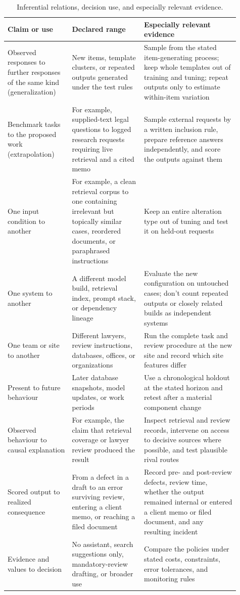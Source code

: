 \documentclass[12pt]{article}
\begin{document}
\begin{table}[tbp]
\centering\scriptsize
\renewcommand{\arraystretch}{0.92}
\caption{Inferential relations, decision use, and especially relevant evidence.}\label{tab:projection_relations}
\begin{tabular}{@{}>{\raggedright\arraybackslash}p{0.25\linewidth}
                    >{\raggedright\arraybackslash}p{0.29\linewidth}
                    >{\raggedright\arraybackslash}p{0.37\linewidth}@{}}
\toprule
Claim or use & Declared range & Especially relevant evidence \\
\midrule
Observed responses to further responses of the same kind (generalization) & New items, template clusters, or repeated outputs generated under the test rules & Sample from the stated item-generating process; keep whole templates out of training and tuning; repeat outputs only to estimate within-item variation \\
Benchmark tasks to the proposed work (extrapolation) & For example, supplied-text legal questions to logged research requests requiring live retrieval and a cited memo & Sample external requests by a written inclusion rule, prepare reference answers independently, and score the outputs against them \\
One input condition to another & For example, a clean retrieval corpus to one containing irrelevant but topically similar cases, reordered documents, or paraphrased instructions & Keep an entire alteration type out of tuning and test it on held-out requests \\
One system to another & A different model build, retrieval index, prompt stack, or dependency lineage & Evaluate the new configuration on untouched cases; don't count repeated outputs or closely related builds as independent systems \\
One team or site to another & Different lawyers, review instructions, databases, offices, or organizations & Run the complete task and review procedure at the new site and record which site features differ \\
Present to future behaviour & Later database snapshots, model updates, or work periods & Use a chronological holdout at the stated horizon and retest after a material component change \\
Observed behaviour to causal explanation & For example, the claim that retrieval coverage or lawyer review produced the result & Inspect retrieval and review records, intervene on access to decisive sources where possible, and test plausible rival routes \\
Scored output to realized consequence & From a defect in a draft to an error surviving review, entering a client memo, or reaching a filed document & Record pre- and post-review defects, review time, whether the output remained internal or entered a client memo or filed document, and any resulting incident \\
Evidence and values to decision & No assistant, search suggestions only, mandatory-review drafting, or broader use & Compare the policies under stated costs, constraints, error tolerances, and monitoring rules \\
\bottomrule
\end{tabular}
\end{table}
\end{document}
